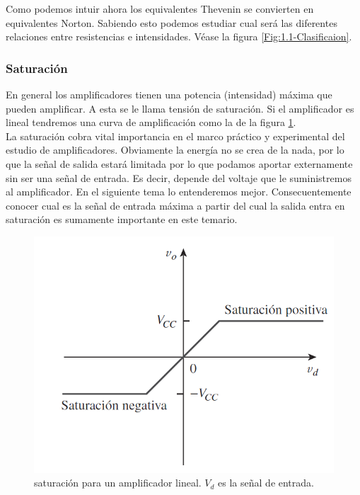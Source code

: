 \documentclass[12pt,a4paper]{article}
\numberwithin{equation}{section}
\numberwithin{figure}{section}
\begin{document}
Como podemos intuir ahora los equivalentes Thevenin se convierten en equivalentes Norton. Sabiendo esto podemos estudiar cual será las diferentes relaciones entre resistencias e intensidades. Véase la figura \ref{Fig:1.1-Clasificaion}.

\subsubsection{Saturación}

En general los amplificadores tienen una potencia (intensidad) máxima que pueden amplificar. A esta se le llama tensión de saturación. Si el amplificador es lineal tendremos una curva de amplificación como la de la figura \ref{Fig:1.1-Saturacion}. \\


La saturación cobra vital importancia en el marco práctico y experimental del estudio de amplificadores. Obviamente la energía no se crea de la nada, por lo que la señal de salida estará limitada por lo que podamos aportar externamente sin ser una señal de entrada. Es decir, depende del voltaje que le suministremos al amplificador. En el siguiente tema lo entenderemos mejor. Consecuentemente conocer cual es la señal de entrada máxima a partir del cual la salida entra en saturación es sumamente importante en este temario.

\begin{figure}[h!] \centering
\includegraphics[scale=0.5]{0.Saturacion}
\caption{saturación para un amplificador lineal. $V_d$ es la señal de entrada.}
\label{Fig:1.1-Saturacion}
\end{figure}
\end{document}
